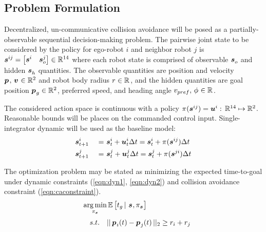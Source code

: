 \documentclass[conference]{IEEEtran}
\begin{document}

\subsection{Problem Formulation}
Decentralized, un-communicative collision avoidance will be posed as a partially-observable sequential decision-making problem. The pairwise joint state to be considered by the policy for ego-robot $i$ and neighbor robot $j$ is $\boldsymbol{s}^{ij}_{}=\begin{bmatrix} \boldsymbol{s}^{i}_{} & \boldsymbol{s}^{j}_{o} \end{bmatrix}\in \mathbb{R}^{14}$ where each robot state is comprised of observable $\boldsymbol{s}^{}_{o}$ and hidden $\boldsymbol{s}^{}_{h}$ quantities. The observable quantities are position and velocity $\boldsymbol{p_{}}_{}, \,  \boldsymbol{v_{}}_{} \in \mathbb{R}^{2}$ and robot body radius $r_{} \in \mathbb{R}^{}$, and the hidden quantities are goal position $\boldsymbol{p_{}}_{g} \in \mathbb{R}^{2}$, preferred speed, and heading angle $v_{pref}, \, \phi_{}\in \mathbb{R}^{}$.

The considered action space is continuous with a policy $\pi_{}(\boldsymbol{s}^{ij}_{})=\boldsymbol{u}^{i}_{\,} : \, \mathbb{R}^{14}\mapsto\mathbb{R}^2$. Reasonable bounds will be places on the commanded control input. Single-integrator dynamic will be used as the baseline model: 
\begin{alignat}{3}
& \state{i}{t+1} & \ = \ & \state{i}{t} + \ctrl{i}{t}\dt = \state{i}{t} + \policy{}(\state{ij}{})\dt \label{eqn:dyn1} \\
& \state{j}{t+1} & \ = \ &\state{j}{t} + \ctrl{j}{t}\dt = \state{j}{t} + \policy{}(\state{ji}{})\dt \label{eqn:dyn2} 
\end{alignat}

The optimization problem may be stated as minimizing the expected time-to-goal under dynamic constraints (\ref{eqn:dyn1}, \ref{eqn:dyn2}) and collision avoidance constraint (\ref{eqn:caconstraint}).
\begin{alignat}{3}
    && \argmin\limits_{\policy{\state{}{}}} & \expectation \left[t_g \, | \ \state{}{}, \policy{\state{}{}}  \right] \\
    && s.t. \quad & \norm{\posvec{i}(t) - \posvec{j}(t)}_2 \geq \radius{i} + \radius{j} \label{eqn:caconstraint}
\end{alignat}
\end{document}
